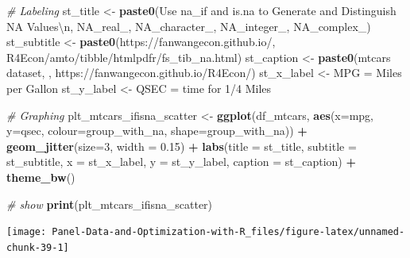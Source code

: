 \documentclass[
]{book}
\newenvironment{Shaded}{\begin{snugshade}}{\end{snugshade}}
\newcommand{\CharTok}[1]{\textcolor[rgb]{0.31,0.60,0.02}{#1}}
\newcommand{\CommentTok}[1]{\textcolor[rgb]{0.56,0.35,0.01}{\textit{#1}}}
\newcommand{\DataTypeTok}[1]{\textcolor[rgb]{0.13,0.29,0.53}{#1}}
\newcommand{\DecValTok}[1]{\textcolor[rgb]{0.00,0.00,0.81}{#1}}
\newcommand{\FloatTok}[1]{\textcolor[rgb]{0.00,0.00,0.81}{#1}}
\newcommand{\KeywordTok}[1]{\textcolor[rgb]{0.13,0.29,0.53}{\textbf{#1}}}
\newcommand{\NormalTok}[1]{#1}
\newcommand{\OperatorTok}[1]{\textcolor[rgb]{0.81,0.36,0.00}{\textbf{#1}}}
\newcommand{\StringTok}[1]{\textcolor[rgb]{0.31,0.60,0.02}{#1}}
\begin{document}
\begin{Shaded}
\begin{Highlighting}[]
\CommentTok{\# Labeling}
\NormalTok{st\_title \textless{}{-}}\StringTok{ }\KeywordTok{paste0}\NormalTok{(}\StringTok{\textquotesingle{}Use na\_if and is.na to Generate and Distinguish NA Values}\CharTok{\textbackslash{}n}\StringTok{\textquotesingle{}}\NormalTok{,}
                   \StringTok{\textquotesingle{}NA\_real\_, NA\_character\_, NA\_integer\_, NA\_complex\_\textquotesingle{}}\NormalTok{)}
\NormalTok{st\_subtitle \textless{}{-}}\StringTok{ }\KeywordTok{paste0}\NormalTok{(}\StringTok{\textquotesingle{}https://fanwangecon.github.io/\textquotesingle{}}\NormalTok{,}
                      \StringTok{\textquotesingle{}R4Econ/amto/tibble/htmlpdfr/fs\_tib\_na.html\textquotesingle{}}\NormalTok{)}
\NormalTok{st\_caption \textless{}{-}}\StringTok{ }\KeywordTok{paste0}\NormalTok{(}\StringTok{\textquotesingle{}mtcars dataset, \textquotesingle{}}\NormalTok{,}
                     \StringTok{\textquotesingle{}https://fanwangecon.github.io/R4Econ/\textquotesingle{}}\NormalTok{)}
\NormalTok{st\_x\_label \textless{}{-}}\StringTok{ \textquotesingle{}MPG = Miles per Gallon\textquotesingle{}}
\NormalTok{st\_y\_label \textless{}{-}}\StringTok{ \textquotesingle{}QSEC = time for 1/4 Miles\textquotesingle{}}

\CommentTok{\# Graphing}
\NormalTok{plt\_mtcars\_ifisna\_scatter \textless{}{-}}\StringTok{ }
\StringTok{  }\KeywordTok{ggplot}\NormalTok{(df\_mtcars, }
         \KeywordTok{aes}\NormalTok{(}\DataTypeTok{x=}\NormalTok{mpg, }\DataTypeTok{y=}\NormalTok{qsec, }
             \DataTypeTok{colour=}\NormalTok{group\_with\_na, }
             \DataTypeTok{shape=}\NormalTok{group\_with\_na)) }\OperatorTok{+}
\StringTok{  }\KeywordTok{geom\_jitter}\NormalTok{(}\DataTypeTok{size=}\DecValTok{3}\NormalTok{, }\DataTypeTok{width =} \FloatTok{0.15}\NormalTok{) }\OperatorTok{+}
\StringTok{  }\KeywordTok{labs}\NormalTok{(}\DataTypeTok{title =}\NormalTok{ st\_title, }\DataTypeTok{subtitle =}\NormalTok{ st\_subtitle,}
       \DataTypeTok{x =}\NormalTok{ st\_x\_label, }\DataTypeTok{y =}\NormalTok{ st\_y\_label, }\DataTypeTok{caption =}\NormalTok{ st\_caption) }\OperatorTok{+}
\StringTok{  }\KeywordTok{theme\_bw}\NormalTok{()}

\CommentTok{\# show}
\KeywordTok{print}\NormalTok{(plt\_mtcars\_ifisna\_scatter)}
\end{Highlighting}
\end{Shaded}

\begin{center}\texttt{[image: Panel-Data-and-Optimization-with-R\_files/figure-latex/unnamed-chunk-39-1]} \end{center}
\end{document}
